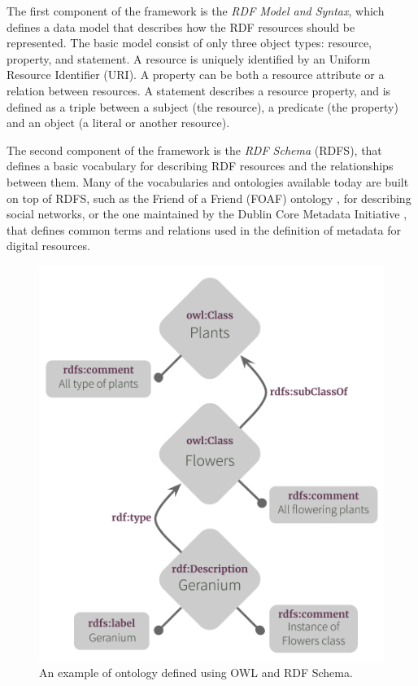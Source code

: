 \documentclass[%
    corpo=13.5pt,
    twoside,
    oldstyle,
    tipotesi=magistrale,
    greek,
    evenboxes
]{toptesi}
\begin{document}
The first component of the framework is the \emph{RDF Model and Syntax},
which defines a data model that describes how the RDF resources should be
represented. The basic model consist of only three object types: resource,
property, and statement.
A resource is uniquely identified by an Uniform Resource Identifier (URI).
A property can be both a resource attribute or a relation between resources.
A statement describes a resource property, and is defined as a triple
between a subject (the resource), a predicate (the property) and an
object (a literal or another resource).

The second component of the framework is the \emph{RDF Schema} (RDFS),
that defines a basic vocabulary for describing RDF resources and the
relationships between them. Many of the vocabularies and ontologies available
today are built on top of RDFS, such as the Friend of a Friend (FOAF)
ontology \cite{brickley2007}, for describing social networks, or the one
maintained by the Dublin Core Metadata Initiative \cite{weibel1998}, that
defines common terms and relations used in the definition of metadata for
digital resources.

\begin{figure}[ht]
\centering
\includegraphics[scale=0.6]{img/owl-ontology-example.png}
\caption{An example of ontology defined using OWL and RDF Schema.}
\label{fig:owl-ontology-example}
\end{figure}
\end{document}
